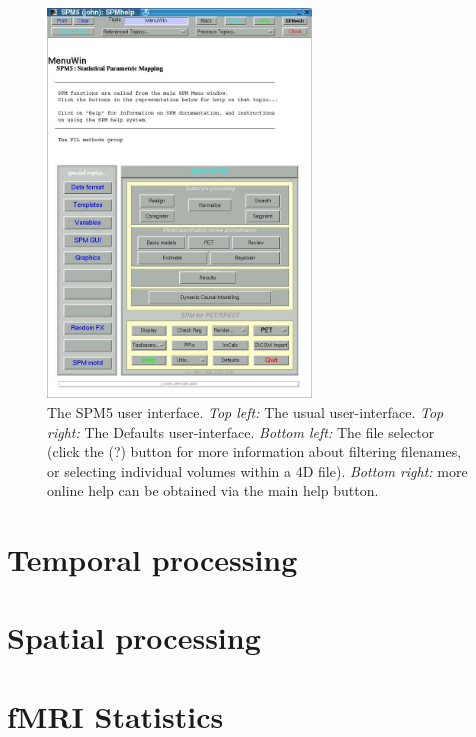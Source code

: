 \documentclass[a4paper,titlepage]{book}
\begin{document}
\begin{figure}
\begin{center}
\includegraphics[width=70mm]{images/ui4}
\end{center}
\caption{The SPM5 user interface. \emph{Top left:} The usual user-interface.  \emph{Top right:} The Defaults user-interface. \emph{Bottom left:} The file selector (click the (?) button for more information about filtering filenames, or selecting individual volumes within a 4D file). \emph{Bottom right:} more online help can be obtained via the main help button.}
\end{figure} 


\part{Temporal processing}


%

\part{Spatial processing}








\part{fMRI Statistics}



%

\end{document}
